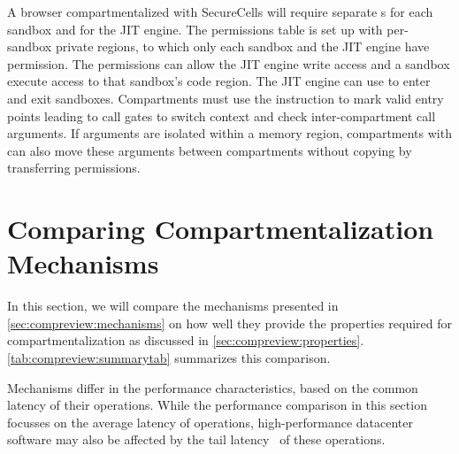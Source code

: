 A browser compartmentalized with SecureCells will require separate
\secdiv{}s for each sandbox and for the JIT engine.
The permissions table is set up with per-sandbox private regions, to which
only each sandbox and the JIT engine have permission.
The permissions can allow the JIT engine write access and a sandbox
execute access to that sandbox's code region.
The JIT engine can use  to enter and exit sandboxes.
Compartments must use the  instruction to mark valid entry points
leading to call gates to switch context and check inter-compartment call
arguments.
If arguments are isolated within a memory region, compartments with 
\seccells can also move these arguments between compartments without copying
by transferring permissions.

\section{Comparing Compartmentalization Mechanisms}
\label{sec:compreview:comparison}
In this section, we will compare the mechanisms presented in 
\autoref{sec:compreview:mechanisms} on how well they provide the properties
required for compartmentalization as discussed in 
\autoref{sec:compreview:properties}.
\autoref{tab:compreview:summarytab} summarizes this comparison.

Mechanisms differ in the performance characteristics, based on the 
common latency of their operations.
While the performance comparison in this section focusses on the 
average latency of operations, high-performance datacenter software 
may also be affected by the tail latency~\cite{LiSPG14} of these operations.


